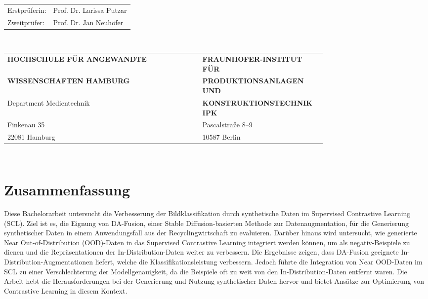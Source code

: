 \begin{titlepage}
  \hspace*{37mm}
  \begin{minipage}{0.5\linewidth}
    \begin{tabular}{@{}ll}
      Erstprüferin: & Prof. Dr. Larissa Putzar\\[-.3mm]
      Zweitprüfer: & Prof. Dr. Jan Neuhöfer \\
    \end{tabular}\\
	
    \vspace{5mm}
	
	\begin{tabular}{@{} p{0.75\linewidth} ll} %
    \textbf{HOCHSCHULE FÜR ANGEWANDTE} & \textbf{FRAUNHOFER-INSTITUT FÜR}\\
    \textbf{WISSENSCHAFTEN HAMBURG} & \textbf{PRODUKTIONSANLAGEN UND}\\
    Department Medientechnik & \textbf{KONSTRUKTIONSTECHNIK IPK}\\
    Finkenau 35 & Pascalstraße 8–9\\
    22081 Hamburg & 10587 Berlin
	\end{tabular}\\
  \end{minipage}
\end{titlepage}
\restoregeometry

\thispagestyle{empty}

\section*{Zusammenfassung}

Diese Bachelorarbeit untersucht die Verbesserung der Bildklassifikation durch synthetische Daten im Supervised Contrastive Learning (SCL). Ziel ist es, die Eignung von DA-Fusion, einer Stable Diffusion-basierten Methode zur Datenaugmentation, für die Generierung synthetischer Daten in einem Anwendungsfall aus der Recyclingwirtschaft zu evaluieren. Darüber hinaus wird untersucht, wie generierte Near Out-of-Distribution (OOD)-Daten in das Supervised Contrastive Learning integriert werden können, um als negativ-Beispiele zu dienen und die Repräsentationen der In-Distribution-Daten weiter zu verbessern. Die Ergebnisse zeigen, dass DA-Fusion geeignete In-Distribution-Augmentationen liefert, welche die Klassifikationsleistung verbessern. Jedoch führte die Integration von Near OOD-Daten im SCL zu einer Verschlechterung der Modellgenauigkeit, da die Beispiele oft zu weit von den In-Distribution-Daten entfernt waren. Die Arbeit hebt die Herausforderungen bei der Generierung und Nutzung synthetischer Daten hervor und bietet Ansätze zur Optimierung von Contrastive Learning in diesem Kontext.

